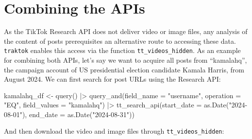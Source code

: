 \documentclass[
  nobib]{ccr}
\newenvironment{Shaded}{\begin{snugshade}}{\end{snugshade}}
\newcommand{\AttributeTok}[1]{\textcolor[rgb]{0.40,0.45,0.13}{#1}}
\newcommand{\CommentTok}[1]{\textcolor[rgb]{0.37,0.37,0.37}{#1}}
\newcommand{\ConstantTok}[1]{\textcolor[rgb]{0.56,0.35,0.01}{#1}}
\newcommand{\FunctionTok}[1]{\textcolor[rgb]{0.28,0.35,0.67}{#1}}
\newcommand{\NormalTok}[1]{\textcolor[rgb]{0.00,0.23,0.31}{#1}}
\newcommand{\OtherTok}[1]{\textcolor[rgb]{0.00,0.23,0.31}{#1}}
\newcommand{\SpecialCharTok}[1]{\textcolor[rgb]{0.37,0.37,0.37}{#1}}
\newcommand{\StringTok}[1]{\textcolor[rgb]{0.13,0.47,0.30}{#1}}
\begin{document}
\section{Combining the APIs}\label{combining-the-apis}

As the TikTok Research API does not deliver video or image files, any
analysis of the content of posts prerequisites an alternative route to
accessing these data. \texttt{traktok} enables this access via the
function \texttt{tt\_videos\_hidden}. As an example for combining both
APIs, let's say we want to acquire all posts from ``kamalahq'', the
campaign account of US presidential election candidate Kamala Harris,
from August 2024. We can first search for post URLs using the Research
API:

\begin{Shaded}
\begin{Highlighting}[]
\NormalTok{kamalahq\_df }\OtherTok{\textless{}{-}} \FunctionTok{query}\NormalTok{() }\SpecialCharTok{|\textgreater{}}
  \FunctionTok{query\_and}\NormalTok{(}\AttributeTok{field\_name =} \StringTok{"username"}\NormalTok{,}
            \AttributeTok{operation =} \StringTok{"EQ"}\NormalTok{,}
            \AttributeTok{field\_values =} \StringTok{"kamalahq"}\NormalTok{) }\SpecialCharTok{|\textgreater{}}
  \FunctionTok{tt\_search\_api}\NormalTok{(}\AttributeTok{start\_date =} \FunctionTok{as.Date}\NormalTok{(}\StringTok{"2024{-}08{-}01"}\NormalTok{),}
                \AttributeTok{end\_date =} \FunctionTok{as.Date}\NormalTok{(}\StringTok{"2024{-}08{-}31"}\NormalTok{))}
\end{Highlighting}
\end{Shaded}

And then download the video and image files through
\texttt{tt\_videos\_hidden}:

\begin{Shaded}
\end{Shaded}
\end{document}
